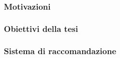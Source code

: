 \frame{\titlepage}

\begin{frame}
    \frametitle{Motivazioni}

\end{frame}

\begin{frame}
    \frametitle{Obiettivi della tesi}

\end{frame}

\begin{frame}
    \frametitle{Sistema di raccomandazione}

\end{frame}

\begin{frame}
    \frametitle{}

\end{frame}

\begin{frame}
    \frametitle{}

\end{frame}

\begin{frame}
    \frametitle{}

\end{frame}

\begin{frame}
    \frametitle{}

\end{frame}

\begin{frame}
    \frametitle{}

\end{frame}

\begin{frame}
    \frametitle{}

\end{frame}

\begin{frame}
    \frametitle{}

\end{frame}

\begin{frame}
    \frametitle{}

\end{frame}